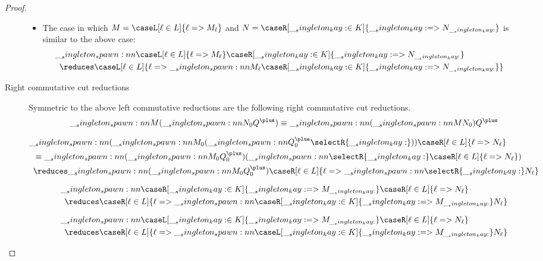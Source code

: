 \begin{proof}
\begin{description}
\begin{itemize}
    \item The case in which $M = \caseL[\ell \in L]{\ell => M_{\ell}}$ and $N = \caseR[\kay \in K]{\kay => N_{\kay}}$ is similar to the above case:
      \begin{align*}
        \MoveEqLeft[0.5]
        \spawn{\caseL[\ell \in L]{\ell => M_{\ell}}}
              {\caseR[\kay \in K]{\kay => N_{\kay}}} \\
          &\reduces \caseL[\ell \in L]{\ell => \spawn{M_{\ell}}{\caseR[\kay \in K]{\kay => N_{\kay}}}}        
      \end{align*}
    \end{itemize}

  \item[Right commutative cut reductions]
    Symmetric to the above left commutative reductions are the following right commutative cut reductions.
    \begin{gather*}
      \spawn{M}{(\spawn{N_0}{Q^{\plus}})}
        \equiv \spawn{(\spawn{M}{N_0})}{Q^{\plus}}
      \\[2\jot]
      \begin{aligned}
        \MoveEqLeft[0.5]
        \spawn{(\spawn{M_0}{(\spawn{Q^{\plus}_0}{\selectR{\kay}})})}{\caseR[\ell \in L]{\ell => N_{\ell}}} \\
          &\equiv \spawn{(\spawn{M_0}{Q^{\plus}_0})}{(\spawn{\selectR{\kay}}{\caseR[\ell \in L]{\ell => N_{\ell}}})} \\
          &\reduces \spawn{(\spawn{M_0}{Q^{\plus}_0})}{\caseR[\ell \in L]{\ell => \spawn{\selectR{\kay}}{N_{\ell}}}}
      \end{aligned}
      \\[2\jot]
      \begin{aligned}
        \MoveEqLeft[0.5]
        \spawn{\caseR[\kay \in K]{\kay => M_{\kay}}}
              {\caseR[\ell \in L]{\ell => N_{\ell}}} \\
          &\reduces \caseR[\ell \in L]{\ell => \spawn{\caseR[\kay \in K]{\kay => M_{\kay}}}{N_{\ell}}}
      \end{aligned}
      \\[2\jot]
      \begin{aligned}
        \MoveEqLeft[0.5]
        \spawn{\caseL[\kay \in K]{\kay => M_{\kay}}}
              {\caseR[\ell \in L]{\ell => N_{\ell}}} \\
          &\reduces \caseR[\ell \in L]{\ell => \spawn{\caseL[\kay \in K]{\kay => M_{\kay}}}{N_{\ell}}}
      \end{aligned}
    \end{gather*}
  \end{description}
\end{proof}


